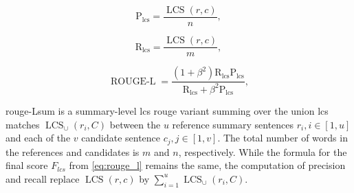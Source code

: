 \begin{equation}
\mathrm{P_{lcs}} = \frac{\operatorname{LCS}(r,c)}{n},
\label{eq:rouge_l_precision}
\end{equation}

\begin{equation}
\mathrm{R_{lcs}} = \frac{\operatorname{LCS}(r,c)}{m},
\label{eq:rouge_l_recall}
\end{equation}

\begin{equation}
\operatorname{ROUGE-L} = \frac{(1 + \beta^2)  \mathrm{R_{lcs}}  \mathrm{P_{lcs}}}{\mathrm{R_{lcs}} + \beta^2  \mathrm{P_{lcs}}},
\label{eq:rouge_l}
\end{equation}

\ac{rouge}-Lsum is a summary-level \ac{lcs} \ac{rouge} variant summing over the union \ac{lcs} matches $\operatorname{LCS}_\cup(r_i,C)$ between the $u$ reference summary sentences $r_i, i \in [1,u]$ and each of the $v$ candidate sentence $c_j, j \in [1,v]$.
The total number of words in the references and candidates is $m$ and $n$, respectively.
While the formula for the final score $F_{lcs}$ from \autoref{eq:rouge_l} remains the same, the computation of precision and recall replace $\operatorname{LCS}(r,c)$ by $\sum_{i=1}^{u}\operatorname{LCS}_\cup(r_i,C)$.
